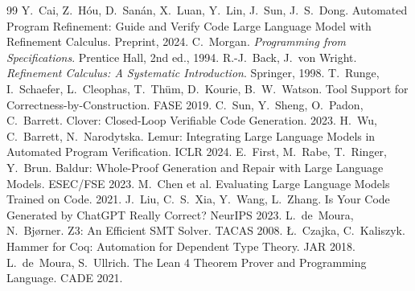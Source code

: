 \documentclass[10pt]{article}
\begin{document}
\begin{thebibliography}{99}
 Y.~Cai, Z.~Hóu, D.~Sanán, X.~Luan, Y.~Lin, J.~Sun, J.~S.~Dong. Automated Program Refinement: Guide and Verify Code Large Language Model with Refinement Calculus. Preprint, 2024.
 C.~Morgan. \emph{Programming from Specifications}. Prentice Hall, 2nd ed., 1994.
 R.-J.~Back, J.~von Wright. \emph{Refinement Calculus: A Systematic Introduction}. Springer, 1998.
 T.~Runge, I.~Schaefer, L.~Cleophas, T.~Thüm, D.~Kourie, B.~W.~Watson. Tool Support for Correctness-by-Construction. FASE 2019.
 C.~Sun, Y.~Sheng, O.~Padon, C.~Barrett. Clover: Closed-Loop Verifiable Code Generation. 2023.
 H.~Wu, C.~Barrett, N.~Narodytska. Lemur: Integrating Large Language Models in Automated Program Verification. ICLR 2024.
 E.~First, M.~Rabe, T.~Ringer, Y.~Brun. Baldur: Whole-Proof Generation and Repair with Large Language Models. ESEC/FSE 2023.
 M.~Chen et al. Evaluating Large Language Models Trained on Code. 2021.
 J.~Liu, C.~S.~Xia, Y.~Wang, L.~Zhang. Is Your Code Generated by ChatGPT Really Correct? NeurIPS 2023.
 L.~de~Moura, N.~Bjørner. Z3: An Efficient SMT Solver. TACAS 2008.
 Ł.~Czajka, C.~Kaliszyk. Hammer for Coq: Automation for Dependent Type Theory. JAR 2018.
 L.~de~Moura, S.~Ullrich. The Lean 4 Theorem Prover and Programming Language. CADE 2021.
\end{thebibliography}
\end{document}
